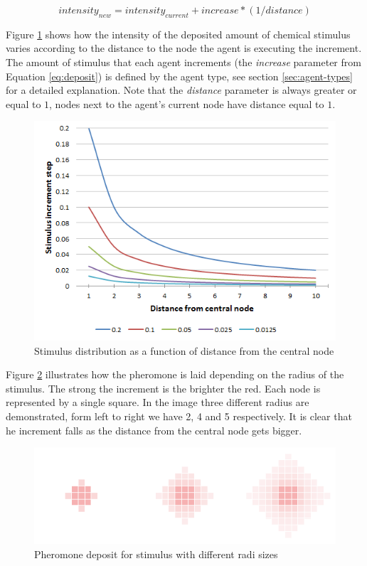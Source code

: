\begin{equation} \label{eq:deposit}
intensity_{new} =  intensity_{current} + increase * (1 / distance)
\end{equation}

Figure \ref{fig:distanse-vs-inc} shows how the intensity of the deposited amount of chemical stimulus varies according to the distance to the node the agent is executing the increment. The amount of stimulus that each agent increments (the \emph{increase} parameter from Equation \ref{eq:deposit}) is defined by the agent type, see section \ref{sec:agent-types} for a detailed explanation. Note that the \emph{distance} parameter is always greater or equal to $1$, nodes next to the agent's current node have distance equal to $1$.

\begin{figure}[H]
  \centering
  \includegraphics[width=0.5\linewidth]{gfx/distance-vs-increment.png}
  \caption{Stimulus distribution as a function of distance from the central node}
  \label{fig:distanse-vs-inc}
\end{figure}

Figure \ref{fig:intensity-example} illustrates how the pheromone is laid depending on the radius of the stimulus. The strong the increment is the brighter the red. Each node is represented by a single square. In the image three different radius are demonstrated, form left to right we have 2, 4 and 5 respectively. It is clear that he increment falls as the distance from the central node gets bigger.

\begin{figure}[H]
  \centering
  \includegraphics[width=0.5\linewidth]{gfx/intensity-example.png}
  \caption{Pheromone deposit for stimulus with different radi sizes}
  \label{fig:intensity-example}
\end{figure}

